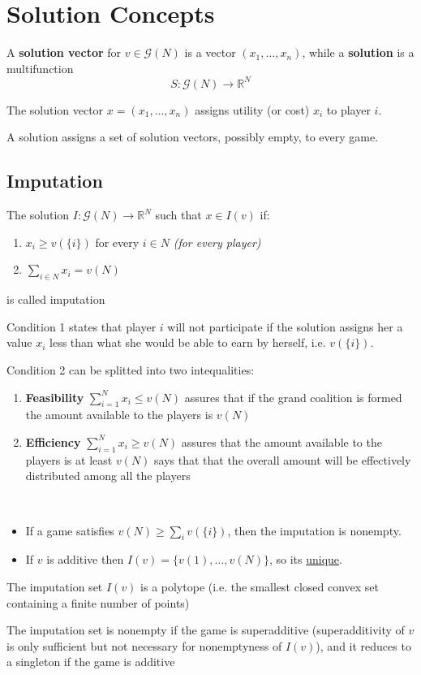 \documentclass[../main.tex]{subfiles}
\begin{document}
\section{Solution Concepts}
\begin{definition}
    A \textbf{solution vector} for $v \in \mathcal{G}(N)$ is a vector $(x_1, \ldots, x_n)$, while a \textbf{solution} is a multifunction
    \[
        S: \mathcal{G}(N) \to \mathbb{R}^N
    \]
\end{definition}
The solution vector $x = (x_1,\ldots,x_n)$ assigns utility (or cost) $x_i$ to player $i$.

A solution assigns a set of solution vectors, possibly empty, to every game.

\subsection{Imputation}
\vspace{0.25cm}
\begin{definition}[Imputation]
    The solution $I : \mathcal{G}(N) \to \mathbb{R}^N$ such that $x \in I(v)$ if:
    \begin{enumerate}
        \item $x_i \geq v(\{i\})$ for every $i \in N$ \textit{(for every player)}
        \item $\sum_{i \in N} x_i = v(N)$
    \end{enumerate}
    is called imputation
\end{definition}
Condition 1 states that player $i$ will not participate if the solution assigns her a
value $x_i$ less than what she would be able to earn by herself, i.e. $v(\{i\})$.

Condition 2 can be splitted into two intequalities:
\begin{enumerate}
    \item \textbf{Feasibility} $\sum_{i = 1}^N x_i \leq v(N)$ assures that if the grand coalition is formed the amount available to the players is $v(N)$
    \item \textbf{Efficiency} $\sum_{i = 1}^N x_i \geq v(N)$ assures that the amount available to the players is at least $v(N)$ says that that the overall amount will be effectively distributed among all the players
\end{enumerate}
\begin{note}\
    \begin{itemize}
        \item If a game satisfies $v(N) \geq \sum_i v (\{i\})$, then the imputation is nonempty.
        \item If $v$ is additive then $I(v) = \{v(1), \ldots, v(N)\}$, so its \underline{unique}.
    \end{itemize}
\end{note}
\begin{proposition}
    The imputation set $I(v)$ is a polytope (i.e. the smallest closed convex set containing a finite number of points)
\end{proposition}
The imputation set is nonempty if the game is superadditive (superadditivity of $v$ is only sufficient but not necessary for nonemptyness of $I(v)$), and it reduces to a singleton if the game is additive
\end{document}
